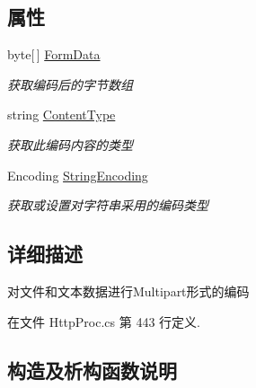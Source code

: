 \subsection*{属性}
\begin{DoxyCompactItemize}
\item 
byte\mbox{[}$\,$\mbox{]} \hyperlink{class_x_c_l_net_tools_1_1_file_handler_1_1_multipart_form_ad540886372239dbb4fcc975e694be5d9}{Form\+Data}
\begin{DoxyCompactList}\small\item\em 获取编码后的字节数组 \end{DoxyCompactList}\item 
string \hyperlink{class_x_c_l_net_tools_1_1_file_handler_1_1_multipart_form_a634f22e875a4d7eb49a729dcb2903f86}{Content\+Type}
\begin{DoxyCompactList}\small\item\em 获取此编码内容的类型 \end{DoxyCompactList}\item 
Encoding \hyperlink{class_x_c_l_net_tools_1_1_file_handler_1_1_multipart_form_ade83206c0e41ad24ba543ebd89e0281f}{String\+Encoding}
\begin{DoxyCompactList}\small\item\em 获取或设置对字符串采用的编码类型 \end{DoxyCompactList}\end{DoxyCompactItemize}


\subsection{详细描述}
对文件和文本数据进行\+Multipart形式的编码 



在文件 Http\+Proc.\+cs 第 443 行定义.



\subsection{构造及析构函数说明}
